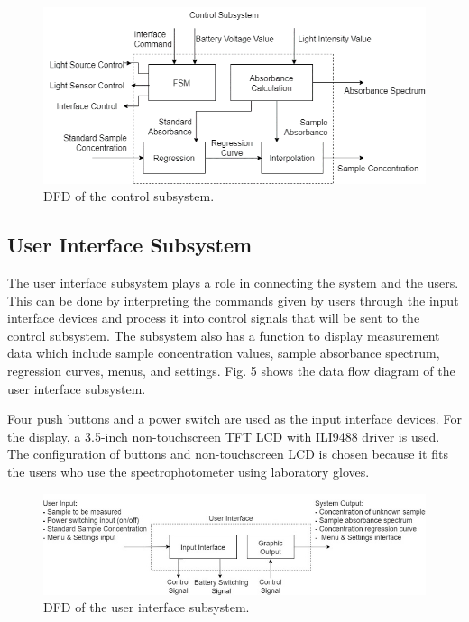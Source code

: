 \documentclass[conference]{IEEEtran}
\begin{document}
    \begin{figure}[htbp]
    \centerline{\includegraphics{control-dfd.png}}
    \caption{DFD of the control subsystem.}
    \label{control-dfd}
    \end{figure}

\subsection{User Interface Subsystem}
The user interface subsystem plays a role in connecting the system and the users. This can be done by interpreting the commands given by users through the input interface devices and process it into control signals that will be sent to the control subsystem. The subsystem also has a function to display measurement data which include sample concentration values, sample absorbance spectrum, regression curves, menus, and settings. Fig. 5 shows the data flow diagram of the user interface subsystem.

Four push buttons and a power switch are used as the input interface devices. For the display, a 3.5-inch non-touchscreen TFT LCD with ILI9488 driver is used. The configuration of buttons and non-touchscreen LCD is chosen because it fits the users who use the spectrophotometer using laboratory gloves.

    \begin{figure}[htbp]
    \centerline{\includegraphics{ui-dfd.png}}
    \caption{DFD of the user interface subsystem.}
    \label{ui-dfd}
    \end{figure}
\end{document}
